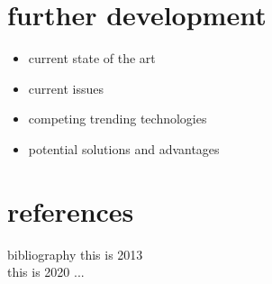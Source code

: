 \documentclass[t, aspectratio=169]{beamer}
\begin{document}
\section{further development}
\begin{frame}[c]
\centering\LARGE\textbf{\secname}
\end{frame}

\begin{frame}{\secname}
	\begin{itemize}
		\item current state of the art
		\item current issues
		\item competing trending technologies
		\item potential solutions and advantages
	\end{itemize}
	\vspace{1 cm}
\end{frame}


\section{references}
\begin{frame}[c]
\centering\LARGE\textbf{\secname}
\end{frame}

\begin{frame}{bibliography}
this is 2013 \cite{Kim2013} \\

this is 2020 ... 


%
%

\end{frame}


\frame{}

\end{document}
